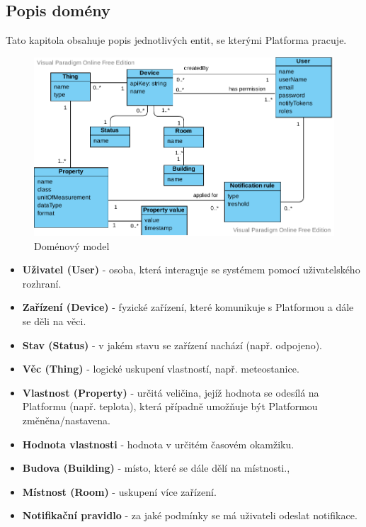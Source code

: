 \subsection{Popis domény}
Tato kapitola obsahuje popis jednotlivých entit, se kterými Platforma pracuje.
\begin{figure}[htbp]
    \centering
    \includegraphics[width=\textwidth]{img/domain.pdf}
    \caption{  \label{domain-model}Doménový model}
\end{figure}
\begin{itemize}
    \item \textbf{Uživatel (User)} - osoba, která interaguje se systémem pomocí uživatelského rozhraní.
    \item \textbf{Zařízení (Device)} - fyzické zařízení, které komunikuje s Platformou a dále se děli na věci.
    \item \textbf{Stav (Status)} - v jakém stavu se zařízení nachází (např. odpojeno).
    \item \textbf{Věc (Thing)} - logické uskupení vlastností, např. meteostanice.
    \item \textbf{Vlastnost (Property)} - určitá veličina, jejíž hodnota se odesílá na Platformu (např. teplota), která případně umožňuje být Platformou změněna/nastavena.
    \item \textbf{Hodnota vlastnosti} - hodnota v určitém časovém okamžiku.
    \item \textbf{Budova (Building)} - místo, které se dále dělí na místnosti.,
    \item \textbf{Místnost (Room)} - uskupení více zařízení.
    \item \textbf{Notifikační pravidlo} - za jaké podmínky se má uživateli odeslat notifikace.
\end{itemize}


